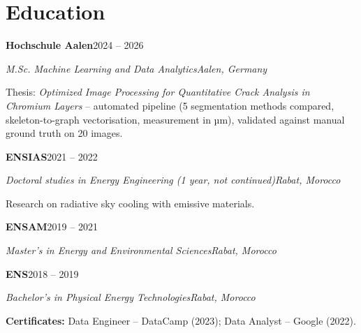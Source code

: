 \documentclass[10pt,a4paper]{article}
\newcommand{\org}[4]{%
  \par\vspace{4pt}\noindent\textbf{#1}\hfill #2\par
  \noindent\textit{#3}\hfill\textit{#4}\par}
\begin{document}
\section{Education}
\org{Hochschule Aalen}{2024 -- 2026}{M.Sc. Machine Learning and Data Analytics}{Aalen, Germany}
\noindent Thesis: \textit{Optimized Image Processing for Quantitative Crack Analysis in Chromium Layers} -- automated pipeline (5 segmentation methods compared, skeleton-to-graph vectorisation, measurement in µm), validated against manual ground truth on 20 images.\par
\org{ENSIAS}{2021 -- 2022}{Doctoral studies in Energy Engineering (1 year, not continued)}{Rabat, Morocco}
\noindent Research on radiative sky cooling with emissive materials.\par
\org{ENSAM}{2019 -- 2021}{Master's in Energy and Environmental Sciences}{Rabat, Morocco}
\org{ENS}{2018 -- 2019}{Bachelor's in Physical Energy Technologies}{Rabat, Morocco}

\vspace{5pt}
\textbf{Certificates:} Data Engineer -- DataCamp (2023); Data Analyst -- Google (2022).\par
\end{document}
